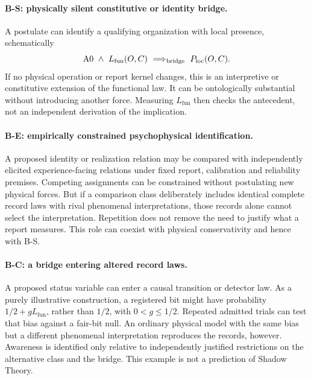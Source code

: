 \paragraph{B-S: physically silent constitutive or identity bridge.}
A postulate can identify a qualifying organization with local presence, schematically
\begin{equation}\label{eq:silent-bridge}
 \mathrm{A0}\ \land\ L_{\mathrm{fun}}(O,C)
 \ \Longrightarrow_{\text{bridge}}\ P_{\mathrm{loc}}(O,C).
\end{equation}
If no physical operation or report kernel changes, this is an interpretive or constitutive extension of the functional law. It can be ontologically substantial without introducing another force. Measuring \(L_{\mathrm{fun}}\) then checks the antecedent, not an independent derivation of the implication.

\paragraph{B-E: empirically constrained psychophysical identification.}
A proposed identity or realization relation may be compared with independently elicited experience-facing relations under fixed report, calibration and reliability premises. Competing assignments can be constrained without postulating new physical forces. But if a comparison class deliberately includes identical complete record laws with rival phenomenal interpretations, those records alone cannot select the interpretation. Repetition does not remove the need to justify what a report measures. This role can coexist with physical conservativity and hence with B-S.

\paragraph{B-C: a bridge entering altered record laws.}
A proposed status variable can enter a causal transition or detector law. As a purely illustrative construction, a registered bit might have probability \(1/2+gL_{\mathrm{fun}}\), rather than \(1/2\), with \(0<g\le1/2\). Repeated admitted trials can test that bias against a fair-bit null. An ordinary physical model with the same bias but a different phenomenal interpretation reproduces the records, however. Awareness is identified only relative to independently justified restrictions on the alternative class and the bridge. This example is not a prediction of Shadow Theory.

